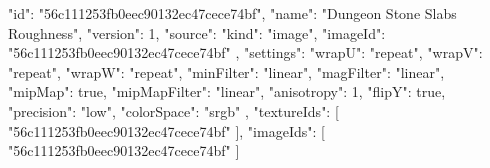{
  "id": "56c111253fb0eec90132ec47cece74bf",
  "name": "Dungeon Stone Slabs Roughness",
  "version": 1,
  "source": {
    "kind": "image",
    "imageId": "56c111253fb0eec90132ec47cece74bf"
  },
  "settings": {
    "wrapU": "repeat",
    "wrapV": "repeat",
    "wrapW": "repeat",
    "minFilter": "linear",
    "magFilter": "linear",
    "mipMap": true,
    "mipMapFilter": "linear",
    "anisotropy": 1,
    "flipY": true,
    "precision": "low",
    "colorSpace": "srgb"
  },
  "textureIds": [
    "56c111253fb0eec90132ec47cece74bf"
  ],
  "imageIds": [
    "56c111253fb0eec90132ec47cece74bf"
  ]
}
